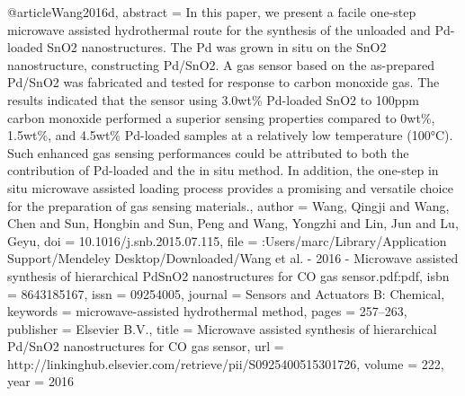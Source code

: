 @article{Wang2016d,
abstract = {In this paper, we present a facile one-step microwave assisted hydrothermal route for the synthesis of the unloaded and Pd-loaded SnO2 nanostructures. The Pd was grown in situ on the SnO2 nanostructure, constructing Pd/SnO2. A gas sensor based on the as-prepared Pd/SnO2 was fabricated and tested for response to carbon monoxide gas. The results indicated that the sensor using 3.0wt{\%} Pd-loaded SnO2 to 100ppm carbon monoxide performed a superior sensing properties compared to 0wt{\%}, 1.5wt{\%}, and 4.5wt{\%} Pd-loaded samples at a relatively low temperature (100°C). Such enhanced gas sensing performances could be attributed to both the contribution of Pd-loaded and the in situ method. In addition, the one-step in situ microwave assisted loading process provides a promising and versatile choice for the preparation of gas sensing materials.},
author = {Wang, Qingji and Wang, Chen and Sun, Hongbin and Sun, Peng and Wang, Yongzhi and Lin, Jun and Lu, Geyu},
doi = {10.1016/j.snb.2015.07.115},
file = {:Users/marc/Library/Application Support/Mendeley Desktop/Downloaded/Wang et al. - 2016 - Microwave assisted synthesis of hierarchical PdSnO2 nanostructures for CO gas sensor.pdf:pdf},
isbn = {8643185167},
issn = {09254005},
journal = {Sensors and Actuators B: Chemical},
keywords = {microwave-assisted hydrothermal method},
pages = {257--263},
publisher = {Elsevier B.V.},
title = {{Microwave assisted synthesis of hierarchical Pd/SnO2 nanostructures for CO gas sensor}},
url = {http://linkinghub.elsevier.com/retrieve/pii/S0925400515301726},
volume = {222},
year = {2016}
}
